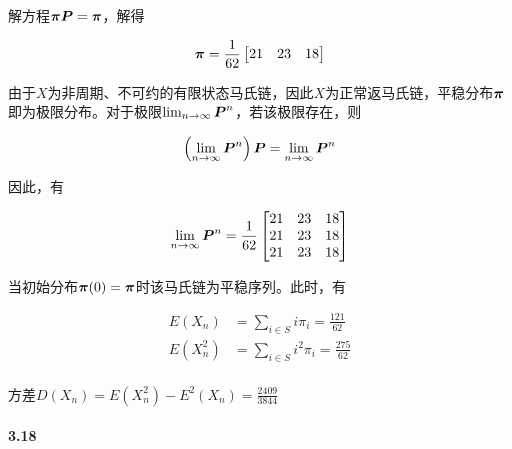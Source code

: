 \documentclass{../notes}
\begin{document}
    \begin{subquestions}
        \item 解方程$\boldsymbol \pi \boldsymbol P = \boldsymbol \pi$，解得

        \begin{equation}
            \boldsymbol \pi = \frac{1}{62}\begin{bmatrix}
                21 & 23 & 18
            \end{bmatrix}
        \end{equation}

        由于$X$为非周期、不可约的有限状态马氏链，因此$X$为正常返马氏链，平稳分布$\boldsymbol \pi$即为极限分布。对于极限$\lim_{n\rightarrow \infty}\boldsymbol P^n$，若该极限存在，则

        \begin{equation}
            \left(\lim_{n\rightarrow \infty}\boldsymbol P^n\right)\boldsymbol P = \lim_{n\rightarrow \infty}\boldsymbol P^n
        \end{equation}

        因此，有

        \begin{equation}
            \lim_{n\rightarrow \infty}\boldsymbol P^n = \frac{1}{62}\begin{bmatrix}
                21 & 23 & 18 \\
                21 & 23 & 18 \\
                21 & 23 & 18
            \end{bmatrix}
        \end{equation}
        \item 当初始分布$\boldsymbol \pi(0) = \boldsymbol\pi$时该马氏链为平稳序列。此时，有

        \begin{eqnarray}
            E(X_n) &= \sum_{i\in S} i\pi_i = \frac{121}{62} \\
            E(X_n^2) &= \sum_{i\in S} i^2\pi_i = \frac{275}{62} \\
        \end{eqnarray}

        方差$D(X_n) = E(X_n^2) - E^2(X_n) = \frac{2409}{3844}$
    \end{subquestions}

    \paragraph*{3.18}
\end{document}

